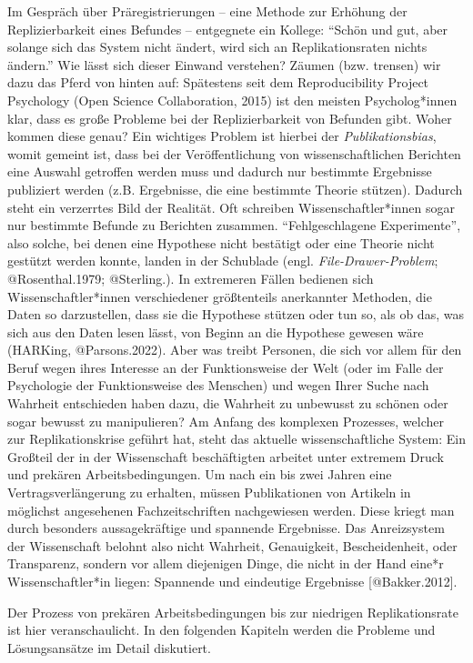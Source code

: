 \documentclass[
  letterpaper,
  DIV=11,
  numbers=noendperiod]{scrreprt}
\begin{document}
Im Gespräch über Präregistrierungen -- eine Methode zur Erhöhung der
Replizierbarkeit eines Befundes -- entgegnete ein Kollege: ``Schön und
gut, aber solange sich das System nicht ändert, wird sich an
Replikationsraten nichts ändern.'' Wie lässt sich dieser Einwand
verstehen? Zäumen (bzw. trensen) wir dazu das Pferd von hinten auf:
Spätestens seit dem Reproducibility Project Psychology (Open Science
Collaboration, 2015) ist den meisten Psycholog*innen klar, dass es große
Probleme bei der Replizierbarkeit von Befunden gibt. Woher kommen diese
genau? Ein wichtiges Problem ist hierbei der \emph{Publikationsbias},
womit gemeint ist, dass bei der Veröffentlichung von wissenschaftlichen
Berichten eine Auswahl getroffen werden muss und dadurch nur bestimmte
Ergebnisse publiziert werden (z.B. Ergebnisse, die eine bestimmte
Theorie stützen). Dadurch steht ein verzerrtes Bild der Realität. Oft
schreiben Wissenschaftler*innen sogar nur bestimmte Befunde zu Berichten
zusammen. ``Fehlgeschlagene Experimente'', also solche, bei denen eine
Hypothese nicht bestätigt oder eine Theorie nicht gestützt werden
konnte, landen in der Schublade (engl. \emph{File-Drawer-Problem};
@Rosenthal.1979; @Sterling.). In extremeren Fällen bedienen sich
Wissenschaftler*innen verschiedener größtenteils anerkannter Methoden,
die Daten so darzustellen, dass sie die Hypothese stützen oder tun so,
als ob das, was sich aus den Daten lesen lässt, von Beginn an die
Hypothese gewesen wäre (HARKing, @Parsons.2022). Aber was treibt
Personen, die sich vor allem für den Beruf wegen ihres Interesse an der
Funktionsweise der Welt (oder im Falle der Psychologie der
Funktionsweise des Menschen) und wegen Ihrer Suche nach Wahrheit
entschieden haben dazu, die Wahrheit zu unbewusst zu schönen oder sogar
bewusst zu manipulieren? Am Anfang des komplexen Prozesses, welcher zur
Replikationskrise geführt hat, steht das aktuelle wissenschaftliche
System: Ein Großteil der in der Wissenschaft beschäftigten arbeitet
unter extremem Druck und prekären Arbeitsbedingungen. Um nach ein bis
zwei Jahren eine Vertragsverlängerung zu erhalten, müssen Publikationen
von Artikeln in möglichst angesehenen Fachzeitschriften nachgewiesen
werden. Diese kriegt man durch besonders aussagekräftige und spannende
Ergebnisse. Das Anreizsystem der Wissenschaft belohnt also nicht
Wahrheit, Genauigkeit, Bescheidenheit, oder Transparenz, sondern vor
allem diejenigen Dinge, die nicht in der Hand eine*r Wissenschaftler*in
liegen: Spannende und eindeutige Ergebnisse {[}@Bakker.2012{]}.

Der Prozess von prekären Arbeitsbedingungen bis zur niedrigen
Replikationsrate ist hier veranschaulicht. In den folgenden Kapiteln
werden die Probleme und Lösungsansätze im Detail diskutiert.
\end{document}
